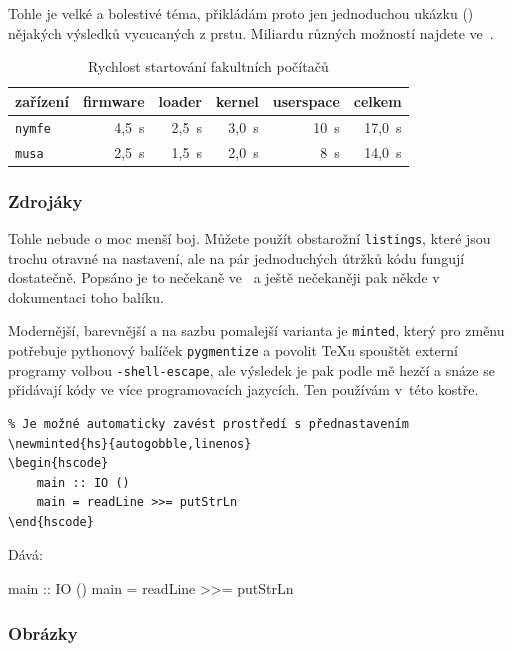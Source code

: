 Tohle je velké a bolestivé téma, přikládám proto jen jednoduchou ukázku
() nějakých výsledků vycucaných z prstu. Miliardu
různých možností najdete ve~\cite{wb}.

\begin{table}
    \centering
    \begin{tabular}{l | r r r r | r}
        zařízení       &  firmware & loader & kernel & userspace & celkem \\\hline
        \texttt{nymfe} &     4,5~s &  2,5~s &  3,0~s &      10~s & 17,0~s \\
        \texttt{musa}  &     2,5~s &  1,5~s &  2,0~s &       8~s & 14,0~s
    \end{tabular}
    \caption{Rychlost startování fakultních počítačů}
    \label{tab:example}
\end{table}

\subsubsection{Zdrojáky}

Tohle nebude o moc menší boj. Můžete použít obstarožní \texttt{listings}, které
jsou trochu otravné na nastavení, ale na pár jednoduchých útržků kódu fungují
dostatečně. Popsáno je to nečekaně ve~\cite{wb} a ještě nečekaněji pak někde
v dokumentaci toho balíku.

Modernější, barevnější a na sazbu pomalejší varianta je \texttt{minted}, který
pro změnu potřebuje pythonový balíček \texttt{pygmentize} a povolit \TeX u
spouštět externí programy volbou \texttt{-shell-escape}, ale výsledek je pak
podle mě hezčí a snáze se přidávají kódy ve více programovacích jazycích. Ten
používám v~této kostře.

\begin{verbatim}
% Je možné automaticky zavést prostředí s přednastavením
\newminted{hs}{autogobble,linenos}
\begin{hscode}
    main :: IO ()
    main = readLine >>= putStrLn
\end{hscode}
\end{verbatim}

Dává:

\begin{hscode}
main :: IO ()
main = readLine >>= putStrLn
\end{hscode}

\subsubsection{Obrázky}

